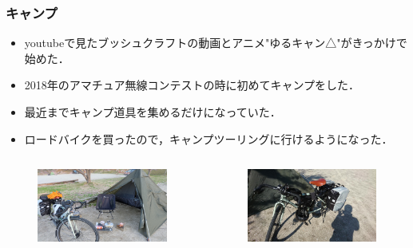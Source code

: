 \begin{frame}
    \frametitle{キャンプ}
    \begin{itemize}
        \item youtubeで見たブッシュクラフトの動画とアニメ"ゆるキャン△"がきっかけで始めた．
        \item 2018年のアマチュア無線コンテストの時に初めてキャンプをした．
        \item 最近までキャンプ道具を集めるだけになっていた．
        \item ロードバイクを買ったので，キャンプツーリングに行けるようになった．
    \end{itemize}
    \begin{columns}
        \begin{column}{0.48\textwidth}
            \begin{figure}[htbp]
                \begin{center}
                    \includegraphics[width=50mm]{pic/pic3.JPG}
                \end{center}
            \end{figure}
        \end{column}
        \begin{column}{0.48\textwidth}
            \begin{figure}[htbp]
                \begin{center}
                    \includegraphics[width=50mm]{pic/pic4.JPG}
                \end{center}
            \end{figure}
        \end{column}
    \end{columns}
\end{frame}

